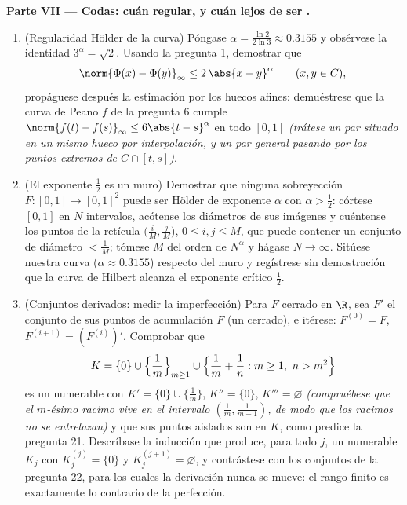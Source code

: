 \begin{problem}
\medskip
\noindent\textbf{Parte VII --- Codas: cuán regular, y cuán lejos de ser
.}
\begin{enumerate}[resume]
  \item (Regularidad Hölder de la curva) Póngase $\alpha =
        \frac{\ln 2}{2\ln 3} \approx 0.3155$ y obsérvese la identidad
  $3^\alpha = \sqrt2$. Usando la pregunta 1, demostrar que
        \[
        \norm{\Phi(x) - \Phi(y)}_\infty \leq 2\,\abs{x -
        y}^\alpha \qquad (x, y \in C),
        \]
        propáguese después la estimación por los huecos afines:
        demuéstrese que la curva de Peano $f$ de la pregunta 6 cumple
        $\norm{f(t) - f(s)}_\infty \leq 6\abs{t - s}^\alpha$ en todo
        $[0,1]$ \emph{(trátese un par situado en un mismo hueco por
        interpolación, y un par general pasando por los puntos extremos
        de $C \cap [t, s]$)}. \item (El exponente $\frac12$ es un muro)
        Demostrar que ninguna sobreyección $F \colon [0,1] \to [0,1]^2$
        puede ser Hölder de exponente $\alpha$ con $\alpha > \frac12$:
        córtese $[0,1]$ en $N$ intervalos, acótense los diámetros de sus
        imágenes y cuéntense los puntos de la retícula
        $\bigl(\frac iM, \frac jM\bigr)$, $0 \leq i, j \leq M$,
        que puede contener un conjunto de diámetro $< \frac1M$; tómese
        $M$ del orden de $N^\alpha$ y hágase $N \to \infty$. Sitúese
        nuestra curva ($\alpha \approx 0.3155$) respecto del muro y
        regístrese sin demostración que la curva de Hilbert alcanza el
        exponente crítico $\frac12$. \item (Conjuntos derivados: medir
        la imperfección) Para $F$ cerrado en $\R$, sea $F'$ el conjunto
        de sus puntos de acumulación $F$ (un cerrado), e itérese:
        $F^{(0)} = F$, $F^{(i+1)}
        = (F^{(i)})'$. Comprobar que
        \[
        K = \{0\} \cup \Bigl\{\frac1m\Bigr\}_{m \geq 1} \cup
        \Bigl\{\frac1m + \frac1n : m \geq 1,\ n > m^2\Bigr\}
        \]
        es un  numerable con
        $K' = \{0\} \cup
        \{\frac1m\}$, $K'' = \{0\}$, $K''' = \varnothing$
        \emph{(compruébese que el $m$-ésimo racimo vive en el intervalo
        $(\frac1m, \frac1{m-1})$, de modo que los racimos no se
        entrelazan)} y que sus puntos aislados son
         en $K$, como predice
        la pregunta 21. Descríbase la inducción que produce, para todo
        $j$, un  numerable
        $K_j$ con $K_j^{(j)} = \{0\}$ y $K_j^{(j+1)} =
        \varnothing$, y contrástese con los conjuntos
         de la pregunta 22,
        para los cuales la derivación nunca se mueve: el rango finito es
        exactamente lo contrario de la perfección.
\end{enumerate}
\end{problem}
